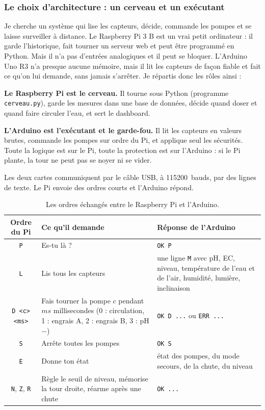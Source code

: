 \subsubsection*{Le choix d'architecture : un cerveau et un exécutant}

Je cherche un système qui lise les capteurs, décide, commande les pompes et se laisse surveiller à distance. Le Raspberry Pi 3 B est un vrai petit ordinateur : il garde l'historique, fait tourner un serveur web et peut être programmé en Python. Mais il n'a pas d'entrées analogiques et il peut se bloquer. L'Arduino Uno R3 n'a presque aucune mémoire, mais il lit les capteurs de façon fiable et fait ce qu'on lui demande, sans jamais s'arrêter. Je répartis donc les rôles ainsi :

\textbf{Le Raspberry Pi est le cerveau.} Il tourne sous Python (programme \texttt{cerveau.py}), garde les mesures dans une base de données, décide quand doser et quand faire circuler l'eau, et sert le dashboard.

\textbf{L'Arduino est l'exécutant et le garde-fou.} Il lit les capteurs en valeurs brutes, commande les pompes sur ordre du Pi, et applique seul les sécurités. Toute la logique est sur le Pi, toute la protection est sur l'Arduino : si le Pi plante, la tour ne peut pas se noyer ni se vider.

Les deux cartes communiquent par le câble USB, à \qty{115200}{bauds}, par des lignes de texte. Le Pi envoie des ordres courts et l'Arduino répond.

\begin{table}[H]
\centering
\small
\begin{tabularx}{\textwidth}{|c|Y|Y|}
\hline
\textbf{Ordre du Pi} & \textbf{Ce qu'il demande} & \textbf{Réponse de l'Arduino} \\
\hline
\texttt{P} & Es-tu là ? & \texttt{OK P} \\
\hline
\texttt{L} & Lis tous les capteurs & une ligne \texttt{M} avec pH, EC, niveau, température de l'eau et de l'air, humidité, lumière, inclinaison \\
\hline
\texttt{D <c> <ms>} & Fais tourner la pompe $c$ pendant $ms$ millisecondes (0 : circulation, 1 : engrais A, 2 : engrais B, 3 : pH$-$) & \texttt{OK D ...} ou \texttt{ERR ...} \\
\hline
\texttt{S} & Arrête toutes les pompes & \texttt{OK S} \\
\hline
\texttt{E} & Donne ton état & état des pompes, du mode secours, de la chute, du niveau \\
\hline
\texttt{N}, \texttt{Z}, \texttt{R} & Règle le seuil de niveau, mémorise la tour droite, réarme après une chute & \texttt{OK ...} \\
\hline
\end{tabularx}
\caption{Les ordres échangés entre le Raspberry Pi et l'Arduino.}
\end{table}

